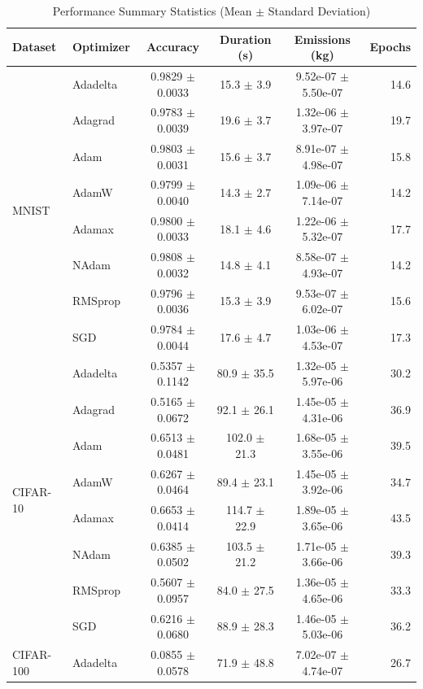 \documentclass[conference]{IEEEtran}
\begin{document}
\begin{table}[htbp]
\centering
\caption{Performance Summary Statistics (Mean $\pm$ Standard Deviation)}
\label{tab:performance_summary}
\footnotesize
\begin{tabular}{@{}llcccr@{}}
\toprule
Dataset & Optimizer & Accuracy & Duration (s) & Emissions (kg) & Epochs \\
\midrule
\multirow{8}{*}{MNIST} 
& Adadelta & 0.9829 $\pm$ 0.0033 & 15.3 $\pm$ 3.9 & 9.52e-07 $\pm$ 5.50e-07 & 14.6 \\
& Adagrad & 0.9783 $\pm$ 0.0039 & 19.6 $\pm$ 3.7 & 1.32e-06 $\pm$ 3.97e-07 & 19.7 \\
& Adam & 0.9803 $\pm$ 0.0031 & 15.6 $\pm$ 3.7 & 8.91e-07 $\pm$ 4.98e-07 & 15.8 \\
& AdamW & 0.9799 $\pm$ 0.0040 & 14.3 $\pm$ 2.7 & 1.09e-06 $\pm$ 7.14e-07 & 14.2 \\
& Adamax & 0.9800 $\pm$ 0.0033 & 18.1 $\pm$ 4.6 & 1.22e-06 $\pm$ 5.32e-07 & 17.7 \\
& NAdam & 0.9808 $\pm$ 0.0032 & 14.8 $\pm$ 4.1 & 8.58e-07 $\pm$ 4.93e-07 & 14.2 \\
& RMSprop & 0.9796 $\pm$ 0.0036 & 15.3 $\pm$ 3.9 & 9.53e-07 $\pm$ 6.02e-07 & 15.6 \\
& SGD & 0.9784 $\pm$ 0.0044 & 17.6 $\pm$ 4.7 & 1.03e-06 $\pm$ 4.53e-07 & 17.3 \\
\midrule
\multirow{8}{*}{CIFAR-10}
& Adadelta & 0.5357 $\pm$ 0.1142 & 80.9 $\pm$ 35.5 & 1.32e-05 $\pm$ 5.97e-06 & 30.2 \\
& Adagrad & 0.5165 $\pm$ 0.0672 & 92.1 $\pm$ 26.1 & 1.45e-05 $\pm$ 4.31e-06 & 36.9 \\
& Adam & 0.6513 $\pm$ 0.0481 & 102.0 $\pm$ 21.3 & 1.68e-05 $\pm$ 3.55e-06 & 39.5 \\
& AdamW & 0.6267 $\pm$ 0.0464 & 89.4 $\pm$ 23.1 & 1.45e-05 $\pm$ 3.92e-06 & 34.7 \\
& Adamax & 0.6653 $\pm$ 0.0414 & 114.7 $\pm$ 22.9 & 1.89e-05 $\pm$ 3.65e-06 & 43.5 \\
& NAdam & 0.6385 $\pm$ 0.0502 & 103.5 $\pm$ 21.2 & 1.71e-05 $\pm$ 3.66e-06 & 39.3 \\
& RMSprop & 0.5607 $\pm$ 0.0957 & 84.0 $\pm$ 27.5 & 1.36e-05 $\pm$ 4.65e-06 & 33.3 \\
& SGD & 0.6216 $\pm$ 0.0680 & 88.9 $\pm$ 28.3 & 1.46e-05 $\pm$ 5.03e-06 & 36.2 \\
\midrule
\multirow{8}{*}{CIFAR-100}
& Adadelta & 0.0855 $\pm$ 0.0578 & 71.9 $\pm$ 48.8 & 7.02e-07 $\pm$ 4.74e-07 & 26.7 \\

\end{tabular}
\end{table}
\end{document}
